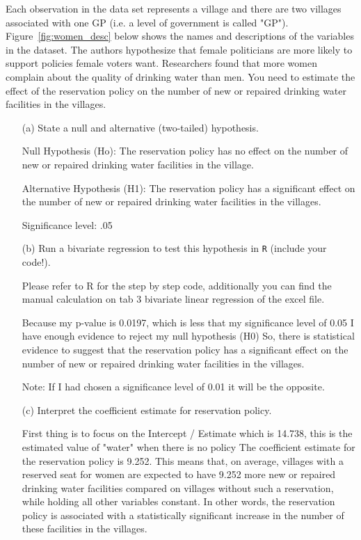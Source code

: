 \documentclass[12pt,letterpaper]{article}
\begin{document}
\noindent Each observation in the data set represents a village and there are two villages associated with one GP (i.e. a level of government is called "GP"). Figure~\ref{fig:women_desc} below shows the names and descriptions of the variables in the dataset. The authors hypothesize that female politicians are more likely to support policies female voters want. Researchers found that more women complain about the quality of drinking water than men. You need to estimate the effect of the reservation policy on the number of new or repaired drinking water facilities in the villages.
\vspace{.5cm}
	

\newpage
\begin{enumerate}
	\item [(a)] State a null and alternative (two-tailed) hypothesis. 
	
	Null Hypothesis (Ho): The reservation policy has no effect on the number of new or repaired drinking water facilities in the village.
	
	Alternative Hypothesis (H1): The reservation policy has a significant effect on the number of new or repaired drinking water facilities in the villages.
	
	Significance level: .05
	
	\vspace{6cm}
	\item [(b)] Run a bivariate regression to test this hypothesis in \texttt{R} (include your code!).
	
	Please refer to R for the step by step code, additionally you can find the manual calculation on tab 3 bivariate linear regression of the excel file.
	
	Because my p-value is 0.0197, which is less that my significance level of 0.05	I have enough evidence to reject my null hypothesis (H0)
	So, there is statistical evidence to suggest that the reservation policy has a significant effect on the number of new or repaired drinking water facilities in the villages.
	
	Note: If I had chosen a significance level of 0.01 it will be the opposite.
	
	\vspace{6cm}
	\item [(c)] Interpret the coefficient estimate for reservation policy. 
	
	First thing is to focus on the Intercept / Estimate which is 14.738, this is the estimated value of "water" when there is no policy
	The coefficient estimate for the reservation policy is 9.252. This means that, on average, villages with a reserved seat for women are expected to have 9.252 more new or 
	repaired drinking water facilities compared on villages without such a reservation, while holding all other variables constant. In other words, the reservation policy is 
	associated with a statistically significant increase in the number of these facilities in the villages.
	
	
\end{enumerate}
\end{document}
